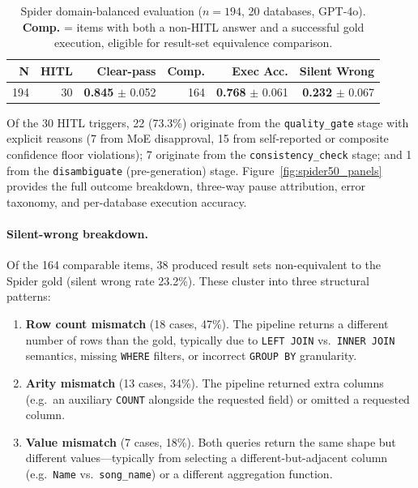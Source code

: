 \documentclass{article}
\begin{document}
\begin{table}[h]
\centering
\caption{Spider domain-balanced evaluation ($n{=}194$, 20 databases, GPT-4o).
  \textbf{Comp.} = items with both a non-HITL answer and a successful gold
  execution, eligible for result-set equivalence comparison.}
\label{tab:spider}
\small
\begin{tabular}{rrrrrr}
\toprule
\textbf{N} & \textbf{HITL} & \textbf{Clear-pass}
  & \textbf{Comp.} & \textbf{Exec Acc.} & \textbf{Silent Wrong} \\
\midrule
194 & 30 & \textbf{0.845} $\pm$ 0.052
  & 164 & \textbf{0.768} $\pm$ 0.061 & \textbf{0.232} $\pm$ 0.067 \\
\bottomrule
\end{tabular}
\end{table}

Of the 30 HITL triggers, 22 (73.3\%) originate from the \texttt{quality\_gate} stage
with explicit reasons (7 from MoE disapproval, 15 from self-reported or composite
confidence floor violations); 7 originate from the \texttt{consistency\_check} stage;
and 1 from the \texttt{disambiguate} (pre-generation) stage.
Figure~\ref{fig:spider50_panels} provides the full outcome breakdown, three-way
pause attribution, error taxonomy, and per-database execution accuracy.

\paragraph{Silent-wrong breakdown.}
\label{sec:silenterrors}
Of the 164 comparable items, 38 produced result sets non-equivalent to the
Spider gold (silent wrong rate 23.2\%).  These cluster into three structural
patterns:

\begin{enumerate}
  \item \textbf{Row count mismatch} (18 cases, 47\%).  The pipeline returns
        a different number of rows than the gold, typically due to
        \texttt{LEFT JOIN} vs.\ \texttt{INNER JOIN} semantics, missing
        \texttt{WHERE} filters, or incorrect \texttt{GROUP BY} granularity.
  \item \textbf{Arity mismatch} (13 cases, 34\%).  The pipeline returned
        extra columns (e.g.\ an auxiliary \texttt{COUNT} alongside the
        requested field) or omitted a requested column.
  \item \textbf{Value mismatch} (7 cases, 18\%).  Both queries return the
        same shape but different values---typically from selecting a
        different-but-adjacent column (e.g.\ \texttt{Name} vs.\
        \texttt{song\_name}) or a different aggregation function.
\end{enumerate}
\end{document}
